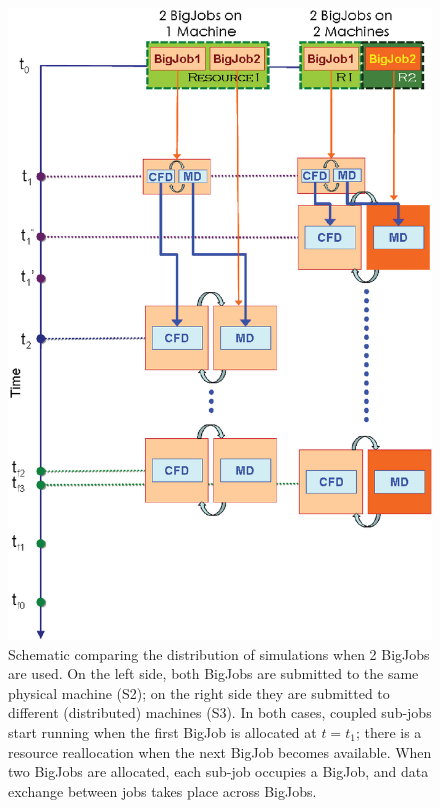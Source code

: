 \documentclass[conference,final]{IEEEtran}
\begin{document}
\begin{figure}
  \centering \includegraphics[scale=0.4]{Simulation_Time_of_Two_BigJobs.eps} \caption{\small
    Schematic comparing the distribution of simulations when 2 BigJobs
    are used. On the left side, both BigJobs are submitted to the same
    physical machine (S2); on the right side they are submitted to
    different (distributed) machines (S3). In both cases, coupled
    sub-jobs start running when the first BigJob is allocated at
    $t=t_1$; there is a resource reallocation when the next BigJob
    becomes available. When two BigJobs are allocated, each sub-job
    occupies a BigJob, and data exchange between jobs takes place
    across BigJobs.}  \label{Fig:TwoBigJobs}
  \vspace{-1em}
 \end{figure}
\end{document}
